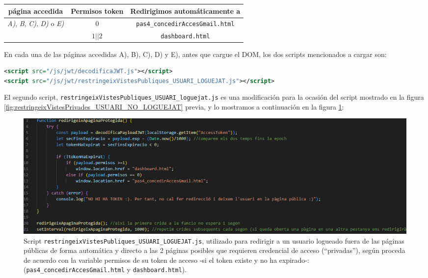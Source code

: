 \documentclass[a4paper,12pt]{report}
\begin{document}
	\begin{table}[h!]
		\centering
		\begin{tabular}{|c|c|c|}
			\hline
			\textbf{página accedida} & \textbf{Permisos token} & \textbf{Redirigimos automáticamente a} \\
			\hline
			\multirow{2}{*}{\textit{A)}, \textit{B}, \textit{C)}, \textit{D)} o \textit{E)}} & $0$ & \texttt{pas4\_concedirAccesGmail.html} \\
			& $1 || 2$ & \texttt{dashboard.html} \\
			\hline
		\end{tabular}
	\end{table}

	En cada una de las páginas accedidas A), B), C), D) y E), antes que cargue el DOM, los dos scripts mencionados a cargar son:
	
\begin{lstlisting}[language=xml, basicstyle=\ttfamily\footnotesize, keywordstyle=\color{magenta}]
<script src="/js/jwt/decodificaJWT.js"></script>
<script src="/js/jwt/restringeixVistesPubliques_USUARI_LOGUEJAT.js"></script>
\end{lstlisting}

El segundo script, \texttt{restringeixVistesPubliques\_USUARI\_loguejat.js} es una modificación para la ocasión del script mostrado en la figura \ref{fig:restringeixVistesPrivades_USUARI_NO_LOGUEJAT} previa, y lo mostramos a continuación en la figura \ref{fig:restringeixVistesPubliquesUSUARILOGUEJAT}:


\setlength{\belowcaptionskip}{3pt}
\FloatBarrier
\begin{figure}[H]
	\centering
	\caption{Script \texttt{restringeixVistesPubliques\_USUARI\_LOGUEJAT.js}, utilizado para redirigir a un usuario logueado fuera de las páginas públicas de forma automática y directo a las 2 páginas posibles que requieren credencial de acceso (``privadas''), según proceda de acuerdo con la variable permisos de su token de acceso -si el token existe y no ha expirado-: (\texttt{pas4\_concedirAccesGmail.html} y \texttt{dashboard.html}).}
	\includegraphics[width=1\linewidth]{img/restringeixVistesPubliques_USUARI_LOGUEJAT.png}
	
	\label{fig:restringeixVistesPubliquesUSUARILOGUEJAT}
\end{figure}
\FloatBarrier	
	
\end{document}
